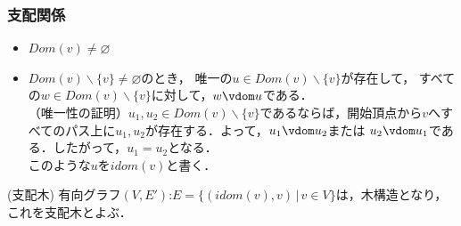 \documentclass[dvipdfmx]{beamer}
\begin{document}
\begin{frame}
  \frametitle{支配関係}

  \begin{itemize}
    \item $Dom(v)\not=\varnothing$
    \item $Dom(v)\backslash\{v\}\not=\varnothing$のとき，
          唯一の$u\in Dom(v)\backslash\{v\}$が存在して，
          すべての$w\in Dom(v)\backslash\{v\}$に対して，$w\vdom u$である．\\
          （唯一性の証明）$u_1,u_2\in Dom(v)\backslash\{v\}$であるならば，開始頂点から$v$へすべてのパス上に$u_1,u_2$が存在する．よって，$u_1\vdom u_2$または
          $u_2\vdom u_1$である．したがって，$u_1=u_2$となる．\\
          このような$u$を$idom(v)$と書く．
  \end{itemize}

  \begin{itembox}[l]{(支配木)}
    有向グラフ$(V,E')$:$E=\{(idom(v),v)\,|\,v\in V\}$は，木構造となり，
    これを支配木とよぶ．
  \end{itembox}
\end{frame}
\end{document}
